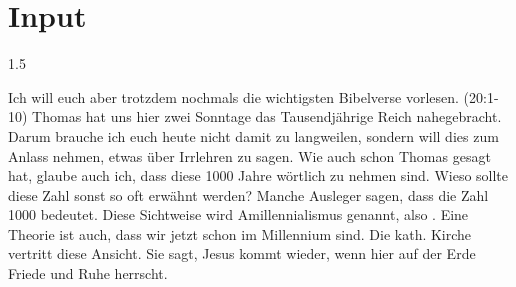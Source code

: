 \documentclass[14pt]{../../inc/mybib}
\begin{document}
\section{ Input }
\begin{spacing}{1.5}
    \begin{block}
        Ich will euch aber trotzdem nochmals die wichtigsten Bibelverse vorlesen.
        (20:1-10) 
        Thomas hat uns hier zwei Sonntage das Tausendjährige Reich nahegebracht. Darum brauche ich euch heute nicht damit zu langweilen, sondern will dies zum Anlass nehmen, etwas über Irrlehren zu sagen. Wie auch schon Thomas gesagt hat, glaube auch ich, dass diese 1000 Jahre wörtlich zu nehmen sind. Wieso sollte diese Zahl sonst so oft erwähnt werden? Manche Ausleger sagen, dass die Zahl 1000  bedeutet. Diese Sichtweise wird Amillennialismus genannt, also . Eine Theorie ist auch, dass wir jetzt schon im Millennium sind. Die kath. Kirche vertritt diese Ansicht. Sie sagt, Jesus kommt wieder, wenn hier auf der Erde Friede und Ruhe herrscht.


\end{block}
\end{spacing}
\end{document}

